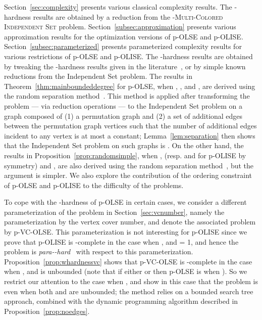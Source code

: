 \documentclass[11pt]{article}
\newcommand{\NP}{\mbox{}}
\begin{document}
Section~\ref{sec:complexity} presents various classical complexity results. The \NP-hardness results are obtained by a reduction from the \textsc{-Multi-Colored Independent Set} problem. Section~\ref{subsec:approximation} presents various approximation results for the optimization versions of p-OLSE and p-OLISE. Section~\ref{subsec:parameterized} presents parameterized complexity results for various restrictions of p-OLSE and p-OLISE. The -hardness results are obtained by tweaking the -hardness results given in the literature~\cite{xiuzhen,evans}, or by simple known reductions from the {\sc Independent Set} problem. The  results in Theorem~\ref{thm:mainboundeddegree} for p-OLSE, when , , and , are derived using the random separation method~\cite{cai}. This method is applied after transforming the problem --- via reduction operations --- to the {\sc Independent Set} problem on a graph composed of (1) a permutation graph and (2) a set of additional edges between the permutation graph vertices such that the number of additional edges incident to any vertex is at most a constant; Lemma~\ref{lem:separation} then shows that the {\sc Independent Set} problem on such graphs is . On the other hand, the  results in Proposition~\ref{prop:randomsimple}, when ,  (resp.  and  for p-OLISE by symmetry) and , are also derived using the random separation method~\cite{cai}, but the argument is simpler. We also explore the contribution of the ordering constraint of p-OLSE and p-OLISE to the difficulty of the problems.

To cope with the -hardness of p-OLSE in certain cases, we consider a different parameterization of the problem in Section~\ref{sec:vcnumber}, namely the parameterization by the vertex cover number, and denote the associated problem by p-VC-OLSE. This parameterization is not interesting for p-OLISE since we prove that p-OLISE is \NP-complete in the case when ,  and  = 1, and hence the problem is {\em para-\NP-hard}~\cite{grohebook} with respect to this parameterization. Proposition~\ref{prop:whardnessvc} shows that p-VC-OLSE is -complete in the case when ,  and  is unbounded (note that if either  or  then p-OLSE is  when ). So we restrict our attention to the case when , and show in this case that the problem is  even when both  and  are unbounded; the method relies on a bounded search tree approach, combined with the dynamic programming algorithm described in Proposition~\ref{prop:noedges}.
\end{document}
